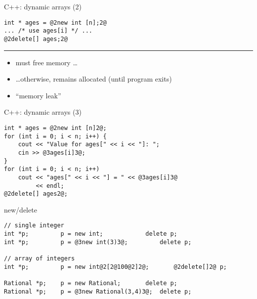 \begin{frame}[fragile,label=dynArray2]{C++: dynamic arrays (2)}
\begin{lstlisting}
int * ages = @2new int [n];2@
... /* use ages[i] */ ...
@2delete[] ages;2@
\end{lstlisting}
\hrule
\begin{itemize}
    \item must  free memory \ldots
    \item \ldots otherwise, remains allocated (until program exits)
    \item ``memory leak''
\end{itemize}
\end{frame}

\begin{frame}[fragile,label=dynArray3]{C++: dynamic arrays (3)}
\begin{lstlisting}
int * ages = @2new int [n]2@;
for (int i = 0; i < n; i++) {
    cout << "Value for ages[" << i << "]: ";
    cin >> @3ages[i]3@;
}
for (int i = 0; i < n; i++)
    cout << "ages[" << i << "] = " << @3ages[i]3@
         << endl;
@2delete[] ages2@;
\end{lstlisting}
\end{frame}

\begin{frame}[fragile,label=newDelete]{new/delete}
\begin{lstlisting}
// single integer
int *p;         p = new int;            delete p;
int *p;         p = @3new int(3)3@;         delete p;

// array of integers
int *p;         p = new int@2[2@100@2]2@;       @2delete[]2@ p;

Rational *p;    p = new Rational;       delete p;
Rational *p;    p = @3new Rational(3,4)3@;  delete p;
\end{lstlisting}
\end{frame}
